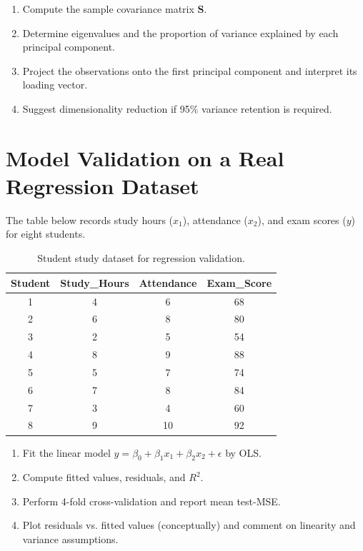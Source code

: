 \documentclass[12pt,a4paper]{article}
\begin{document}
\begin{enumerate}[label=(\arabic*)]
\item Compute the sample covariance matrix \( \mathbf{S} \).
\item Determine eigenvalues and the proportion of variance explained by each principal component.
\item Project the observations onto the first principal component and interpret its loading vector.
\item Suggest dimensionality reduction if 95\% variance retention is required.
\end{enumerate}


\section{Model Validation on a Real Regression Dataset}
The table below records study hours (\(x_1\)), attendance (\(x_2\)), and exam scores (\(y\)) for eight students.

\begin{table}[H]
\centering
\begin{tabular}{c|cc|c}
\toprule
Student & Study\_Hours & Attendance & Exam\_Score \\
\midrule
1 & 4 & 6 & 68 \\
2 & 6 & 8 & 80 \\
3 & 2 & 5 & 54 \\
4 & 8 & 9 & 88 \\
5 & 5 & 7 & 74 \\
6 & 7 & 8 & 84 \\
7 & 3 & 4 & 60 \\
8 & 9 & 10 & 92 \\
\bottomrule
\end{tabular}
\caption{Student study dataset for regression validation.}
\end{table}

\begin{enumerate}[label=(\arabic*)]
\item Fit the linear model \( y = \beta_0 + \beta_1x_1 + \beta_2x_2 + \epsilon \) by OLS.
\item Compute fitted values, residuals, and \( R^2 \).
\item Perform 4-fold cross-validation and report mean test-MSE.
\item Plot residuals vs. fitted values (conceptually) and comment on linearity and variance assumptions.
\end{enumerate}
\end{document}

